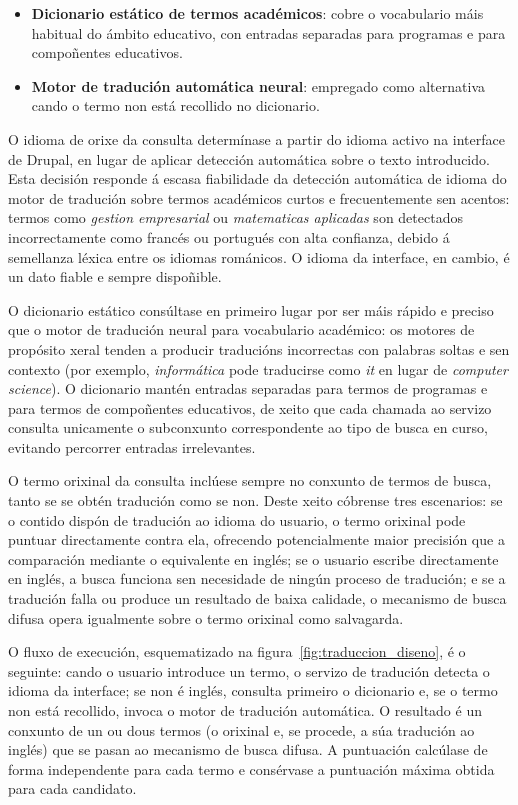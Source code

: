 \documentclass[%
    a4paper,               %
    twoside,               %
    10pt,                  %
]{article}                 %
\begin{document}
\begin{itemize}
    \item \textbf{Dicionario estático de termos académicos}: cobre o vocabulario máis habitual do ámbito educativo, con entradas separadas para programas e para compoñentes educativos.
    \item \textbf{Motor de tradución automática neural}: empregado como alternativa cando o termo non está recollido no dicionario.
\end{itemize}

O idioma de orixe da consulta determínase a partir do idioma activo na interface de Drupal, en lugar de aplicar detección automática sobre o texto introducido. Esta decisión responde á escasa fiabilidade da detección automática de idioma do motor de tradución sobre termos académicos curtos e frecuentemente sen acentos: termos como \textit{gestion empresarial} ou \textit{matematicas aplicadas} son detectados incorrectamente como francés ou portugués con alta confianza, debido á semellanza léxica entre os idiomas románicos. O idioma da interface, en cambio, é un dato fiable e sempre dispoñible.

O dicionario estático consúltase en primeiro lugar por ser máis rápido e preciso que o motor de tradución neural para vocabulario académico: os motores de propósito xeral tenden a producir traducións incorrectas con palabras soltas e sen contexto (por exemplo, \textit{informática} pode traducirse como \textit{it} en lugar de \textit{computer science}). O dicionario mantén entradas separadas para termos de programas e para termos de compoñentes educativos, de xeito que cada chamada ao servizo consulta unicamente o subconxunto correspondente ao tipo de busca en curso, evitando percorrer entradas irrelevantes.

O termo orixinal da consulta inclúese sempre no conxunto de termos de busca, tanto se se obtén tradución como se non. Deste xeito cóbrense tres escenarios: se o contido dispón de tradución ao idioma do usuario, o termo orixinal pode puntuar directamente contra ela, ofrecendo potencialmente maior precisión que a comparación mediante o equivalente en inglés; se o usuario escribe directamente en inglés, a busca funciona sen necesidade de ningún proceso de tradución; e se a tradución falla ou produce un resultado de baixa calidade, o mecanismo de busca difusa opera igualmente sobre o termo orixinal como salvagarda.

O fluxo de execución, esquematizado na figura~\ref{fig:traduccion_diseno}, é o seguinte: cando o usuario introduce un termo, o servizo de tradución detecta o idioma da interface; se non é inglés, consulta primeiro o dicionario e, se o termo non está recollido, invoca o motor de tradución automática. O resultado é un conxunto de un ou dous termos (o orixinal e, se procede, a súa tradución ao inglés) que se pasan ao mecanismo de busca difusa. A puntuación calcúlase de forma independente para cada termo e consérvase a puntuación máxima obtida para cada candidato.
\end{document}
